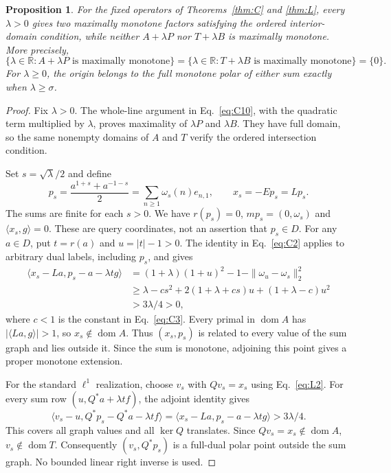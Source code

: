 \documentclass[11pt]{article}
\newcommand{\R}{\mathbb R}
\newcommand{\dom}{\operatorname{dom}}
\newcommand{\pair}[2]{\langle #1,#2\rangle}
\newtheorem{proposition}{Proposition}
\begin{document}
\begin{proposition}\label{prop:all-strengths}
For the fixed operators of Theorems~\ref{thm:C} and \ref{thm:L}, every
$\lambda>0$ gives two maximally monotone factors satisfying the ordered
interior-domain condition, while neither $A+\lambda P$ nor $T+\lambda B$
is maximally monotone. More precisely,
\[
\{\lambda\in\R:A+\lambda P\text{ is maximally monotone}\}
=\{\lambda\in\R:T+\lambda B\text{ is maximally monotone}\}
=\{0\}.
\]
For $\lambda\ge0$, the origin belongs to the full monotone polar of
either sum exactly when $\lambda\ge\sigma$.
\end{proposition}
\begin{proof}
Fix $\lambda>0$. The whole-line argument in Eq.~\eqref{eq:C10}, with
the quadratic term multiplied by $\lambda$, proves maximality of
$\lambda P$ and $\lambda B$. They have full domain, so the same nonempty
domains of $A$ and $T$ verify the ordered intersection condition.

Set $s=\sqrt\lambda/2$ and define
\begin{equation}
p_s=\frac{a^{1+s}+a^{-1-s}}2
   =\sum_{n\ge1}\omega_s(n)e_{n,1},\qquad x_s=-Ep_s=Lp_s.
\label{eq:parameter-query}
\end{equation}
The sums are finite for each $s>0$. We have $r(p_s)=0$,
$mp_s=(0,\omega_s)$ and $\pair{x_s}{g}=0$. These are query coordinates,
not an assertion that $p_s\in D$.
For any $a\in D$, put $t=r(a)$ and $u=|t|-1>0$.
The identity in Eq.~\eqref{eq:C2} applies to arbitrary dual labels,
including $p_s$, and gives
\begin{equation}
\begin{aligned}
\pair{x_s-La}{p_s-a-\lambda t g}
 &=(1+\lambda)(1+u)^2-1-\|\omega_u-\omega_s\|_2^2\\
 &\ge\lambda-cs^2+2(1+\lambda+cs)u+(1+\lambda-c)u^2\\
 &>3\lambda/4>0,
\end{aligned}
\label{eq:parameter-bracket}
\end{equation}
where $c<1$ is the constant in Eq.~\eqref{eq:C3}.
Every primal in $\dom A$ has $|\pair{La}{g}|>1$, so $x_s\notin\dom A$.
Thus $(x_s,p_s)$ is related to every value of the sum graph and lies
outside it. Since the sum is monotone, adjoining this point gives a
proper monotone extension.

For the standard $\ell^1$ realization, choose $v_s$ with $Qv_s=x_s$
using Eq.~\eqref{eq:L2}. For every sum row $(u,Q^*a+\lambda t f)$,
the adjoint identity gives
\begin{equation}
\pair{v_s-u}{Q^*p_s-Q^*a-\lambda t f}
=\pair{x_s-La}{p_s-a-\lambda t g}>3\lambda/4.
\label{eq:parameter-l1}
\end{equation}
This covers all graph values and all $\ker Q$ translates.
Since $Qv_s=x_s\notin\dom A$, $v_s\notin\dom T$.
Consequently $(v_s,Q^*p_s)$ is a full-dual polar point outside the sum
graph. No bounded linear right inverse is used.


\end{proof}
\end{document}
